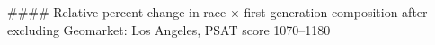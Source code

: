 #### Relative percent change in race × first-generation composition after excluding Geomarket: Los Angeles, PSAT score 1070–1180
